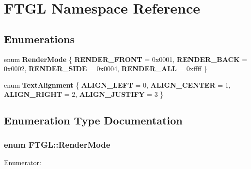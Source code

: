 \section{FTGL Namespace Reference}
\label{namespaceFTGL}
\subsection*{Enumerations}
\begin{CompactItemize}
\item 
enum {\bf RenderMode} \{ {\bf RENDER\_\-FRONT} =  0x0001, 
{\bf RENDER\_\-BACK} =  0x0002, 
{\bf RENDER\_\-SIDE} =  0x0004, 
{\bf RENDER\_\-ALL} =  0xffff
 \}
\item 
enum {\bf TextAlignment} \{ {\bf ALIGN\_\-LEFT} =  0, 
{\bf ALIGN\_\-CENTER} =  1, 
{\bf ALIGN\_\-RIGHT} =  2, 
{\bf ALIGN\_\-JUSTIFY} =  3
 \}
\end{CompactItemize}


\subsection{Enumeration Type Documentation}
\subsubsection[{RenderMode}]{\setlength{\rightskip}{0pt plus 5cm}enum {\bf FTGL::RenderMode}}\label{namespaceFTGL_9916822cb1247bd2e1aae26f7bfec74e}


\begin{Desc}
\item[Enumerator: ]\par
\begin{description}
\item[{\em 
RENDER\_\-FRONT\label{namespaceFTGL_9916822cb1247bd2e1aae26f7bfec74e682a1ee1dff8218153646cfbe570bdae}
}]\item[{\em 
RENDER\_\-BACK\label{namespaceFTGL_9916822cb1247bd2e1aae26f7bfec74e13191d43484e1bfe32598e8cb894cef9}
}]\item[{\em 
RENDER\_\-SIDE\label{namespaceFTGL_9916822cb1247bd2e1aae26f7bfec74e5ce274c9f80d8a48fbe026329885cf92}
}]\item[{\em 
RENDER\_\-ALL\label{namespaceFTGL_9916822cb1247bd2e1aae26f7bfec74e2966ccc38996af16a67387177a8c6a62}
}]\end{description}
\end{Desc}




